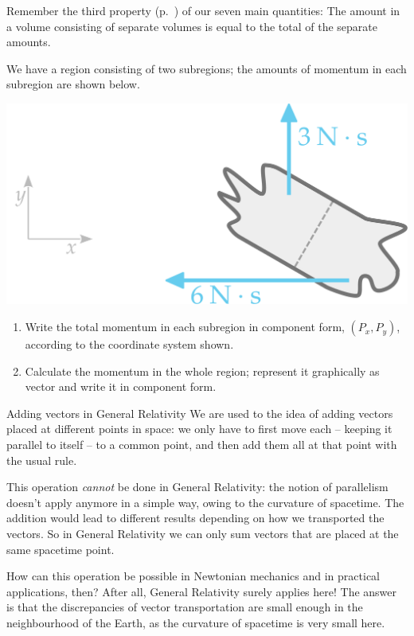 \documentclass[a4paper,12pt,%
onecolumn,oneside,titlepage,%
british%
]{memoir}
\renewcommand*{\|}[1][]{\nonscript\:#1\vert\nonscript\:\mathopen{}}
\begin{document}
\smallskip


\begin{exercise}
  Remember the third property (p.~\pageref{item:extensivity}) of our seven main quantities: The amount in a volume consisting of separate volumes is equal to the total of the separate amounts.

We have a region consisting of two subregions; the amounts of momentum in each subregion are shown below.
  \begin{center}
    \includegraphics[width=0.5\linewidth]{exercise_momentumsum.pdf}
  \end{center}
  \begin{enumerate}[shift,label=\bfseries\arabic*.]
  \item Write the total momentum in each subregion in component form, $(P_{x}, P_{y})$, according to the coordinate system shown.
  \item Calculate the momentum in the whole region; represent it graphically as vector and write it in component form.
  \end{enumerate}

  
\end{exercise}

\begin{extra}{Adding vectors in General Relativity}
 We are used to the idea of adding vectors placed at different points in space: we only have to first move each -- keeping it parallel to itself -- to a common point, and then add them all at that point with the usual rule.

  This operation \emph{cannot} be done in General Relativity: the notion of parallelism doesn't apply anymore in a simple way, owing to the curvature of spacetime. The addition would lead to different results depending on how we transported the vectors. So in General Relativity we can only sum vectors that are placed at the same spacetime point.

  How can this operation be possible in Newtonian mechanics and in practical applications, then? After all, General Relativity surely applies here! The answer is that the discrepancies of vector transportation are small enough in the neighbourhood of the Earth, as the curvature of spacetime is very small here.
\end{extra}
\end{document}

